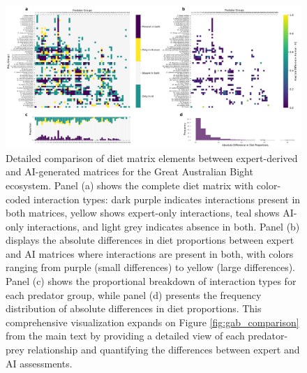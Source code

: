 \begin{landscape}
  \begin{figure}[p]
      \centering
      \includegraphics[width=\linewidth]{figures/diet_matrix_validation/detailed_comparison.png}
      \caption{Detailed comparison of diet matrix elements between expert-derived and AI-generated matrices for the Great Australian Bight ecosystem. Panel (a) shows the complete diet matrix with color-coded interaction types: dark purple indicates interactions present in both matrices, yellow shows expert-only interactions, teal shows AI-only interactions, and light grey indicates absence in both. Panel (b) displays the absolute differences in diet proportions between expert and AI matrices where interactions are present in both, with colors ranging from purple (small differences) to yellow (large differences). Panel (c) shows the proportional breakdown of interaction types for each predator group, while panel (d) presents the frequency distribution of absolute differences in diet proportions. This comprehensive visualization expands on Figure \ref{fig:gab_comparison} from the main text by providing a detailed view of each predator-prey relationship and quantifying the differences between expert and AI assessments.}
      \label{fig:detailed_comparison_supp}
  \end{figure}
\end{landscape}
  
\label{supp:group_stability}

